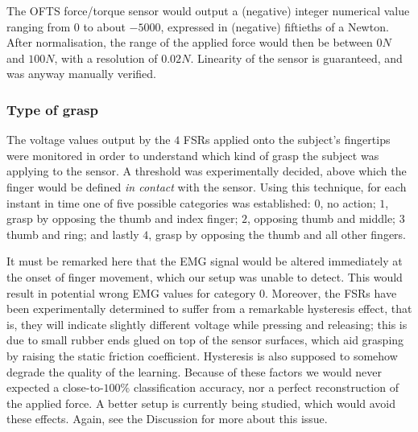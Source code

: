 The OFTS force/torque sensor would output a (negative) integer
numerical value ranging from $0$ to about $-5000$, expressed in
(negative) fiftieths of a Newton. After normalisation, the range of
the applied force would then be between $0N$ and $100N$, with a
resolution of $0.02N$. Linearity of the sensor is guaranteed, and was
anyway manually verified.

\subsubsection{Type of grasp}

The voltage values output by the $4$ FSRs applied onto the subject's
fingertips were monitored in order to understand which kind of grasp
the subject was applying to the sensor. A threshold was experimentally
decided, above which the finger would be defined \emph{in contact}
with the sensor. Using this technique, for each instant in time one of
five possible categories was established: $0$, no action; $1$, grasp
by opposing the thumb and index finger; $2$, opposing thumb and
middle; $3$ thumb and ring; and lastly $4$, grasp by opposing the
thumb and all other fingers.

It must be remarked here that the EMG signal would be altered
immediately at the onset of finger movement, which our setup was
unable to detect. This would result in potential wrong EMG values for
category $0$. Moreover, the FSRs have been experimentally determined
to suffer from a remarkable hysteresis effect, that is, they will
indicate slightly different voltage while pressing and releasing; this
is due to small rubber ends glued on top of the sensor surfaces, which
aid grasping by raising the static friction coefficient. Hysteresis is
also supposed to somehow degrade the quality of the learning. Because
of these factors we would never expected a close-to-$100\%$
classification accuracy, nor a perfect reconstruction of the applied
force. A better setup is currently being studied, which would avoid
these effects. Again, see the Discussion for more about this issue.

